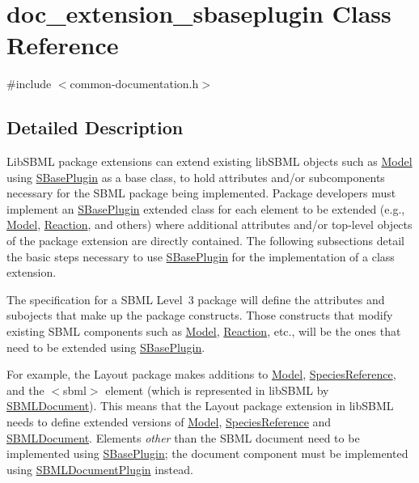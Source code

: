 \hypertarget{classdoc__extension__sbaseplugin}{}\section{doc\+\_\+extension\+\_\+sbaseplugin Class Reference}
\label{classdoc__extension__sbaseplugin}


{\ttfamily \#include $<$common-\/documentation.\+h$>$}



\subsection{Detailed Description}
\begin{DoxyParagraph}{}
Lib\+S\+B\+ML package extensions can extend existing lib\+S\+B\+ML objects such as \hyperlink{class_model}{Model} using \hyperlink{class_s_base_plugin}{S\+Base\+Plugin} as a base class, to hold attributes and/or subcomponents necessary for the S\+B\+ML package being implemented. Package developers must implement an \hyperlink{class_s_base_plugin}{S\+Base\+Plugin} extended class for each element to be extended (e.\+g., \hyperlink{class_model}{Model}, \hyperlink{class_reaction}{Reaction}, and others) where additional attributes and/or top-\/level objects of the package extension are directly contained. The following subsections detail the basic steps necessary to use \hyperlink{class_s_base_plugin}{S\+Base\+Plugin} for the implementation of a class extension.
\end{DoxyParagraph}


The specification for a S\+B\+ML Level~3 package will define the attributes and subojects that make up the package constructs. Those constructs that modify existing S\+B\+ML components such as \hyperlink{class_model}{Model}, \hyperlink{class_reaction}{Reaction}, etc., will be the ones that need to be extended using \hyperlink{class_s_base_plugin}{S\+Base\+Plugin}.

For example, the Layout package makes additions to \hyperlink{class_model}{Model}, \hyperlink{class_species_reference}{Species\+Reference}, and the {\ttfamily $<$sbml$>$} element (which is represented in lib\+S\+B\+ML by \hyperlink{class_s_b_m_l_document}{S\+B\+M\+L\+Document}). This means that the Layout package extension in lib\+S\+B\+ML needs to define extended versions of \hyperlink{class_model}{Model}, \hyperlink{class_species_reference}{Species\+Reference} and \hyperlink{class_s_b_m_l_document}{S\+B\+M\+L\+Document}. Elements {\itshape other} than the S\+B\+ML document need to be implemented using \hyperlink{class_s_base_plugin}{S\+Base\+Plugin}; the document component must be implemented using \hyperlink{class_s_b_m_l_document_plugin}{S\+B\+M\+L\+Document\+Plugin} instead.

